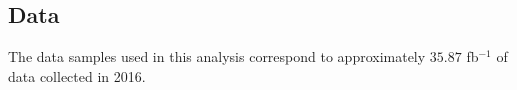 \subsection{Data}

The data samples used in this analysis correspond to approximately $35.87$ fb$^{-1}$ of data collected in 2016.

